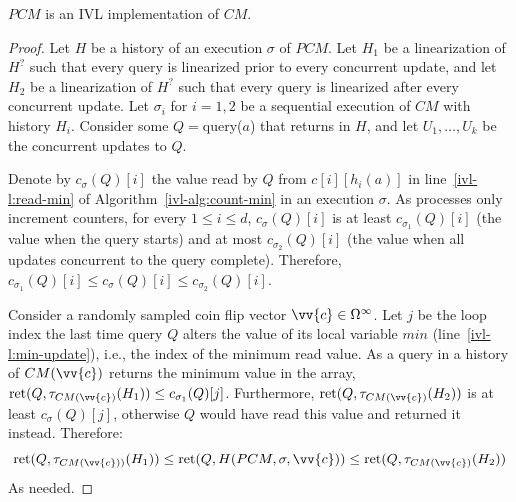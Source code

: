 \begin{lemma}
    $PCM$ is an IVL implementation of $CM$.
    \label{ivl-lmma:count-min-ivl}
\end{lemma}
\begin{proof}
    Let $H$ be a history of an execution $\sigma$ of $PCM$.
    Let $H_1$ be a linearization of $H^?$ such that every query is linearized prior to every
    concurrent update, and let $H_2$ be a linearization of $H^?$ such that every query is linearized after every
    concurrent update. Let $\sigma_i$ for $i=1,2$ be a sequential execution of $CM$ with history $H_i$.
    Consider some $Q=${\sc query}($a$) that returns in $H$, and let $U_1,\dots,U_k$ be the concurrent updates to $Q$.
    
    Denote by $c_\sigma(Q)[i]$ the value read by $Q$ from $c[i][h_i(a)]$ in line~\ref{ivl-l:read-min} of Algorithm~\ref{ivl-alg:count-min}
    in an execution $\sigma$.
    As processes only increment counters, for every $1 \leq i \leq d$, $c_{\sigma}(Q)[i]$ is at least
    $c_{\sigma_1}(Q)[i]$ (the value when the query starts) and at most $c_{\sigma_2}(Q)[i]$ (the value when
    all updates concurrent to the query complete). Therefore,
    $c_{\sigma_1}(Q)[i] \leq c_{\sigma}(Q)[i] \leq c_{\sigma_2}(Q)[i]$.

    Consider a randomly sampled coin flip vector $\vv{c} \in \Omega^\infty$.
    Let $j$ be the loop index the last time query $Q$ alters the value of its local variable $min$ (line~\ref{ivl-l:min-update}),
    i.e., the index of the minimum read value.
    As a query in a history of $CM(\vv{c})$ returns the minimum value in the array, $\text{ret}(Q, \tau_{CM(\vv{c})}(H_1)) \leq c_{\sigma_1}(Q)[j]$. Furthermore, $\text{ret}(Q, \tau_{CM(\vv{c})}(H_2))$
    is at least $c_{\sigma}(Q)[j]$, otherwise $Q$ would have read this value and returned it instead. Therefore:
    \[
        \text{ret}(Q, \tau_{CM(\vv{c}))}(H_1)) \leq \text{ret}(Q, H(PCM, \sigma, \vv{c})) \leq \text{ret}(Q, \tau_{CM(\vv{c})}(H_2))
    \]
    As needed.
\end{proof}

